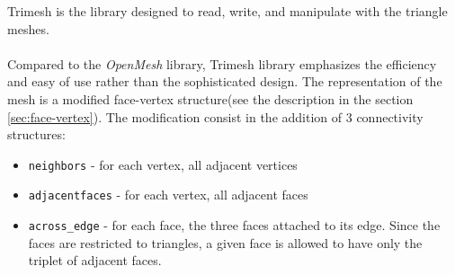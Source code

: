 Trimesh is the library designed to read, write, and manipulate with the triangle meshes\cite{trimesh}.\\
\\
Compared to the \emph{OpenMesh} library, Trimesh library emphasizes the efficiency
and easy of use rather than the sophisticated design. The representation of the mesh
is a modified face-vertex structure(see the description in the section \ref{sec:face-vertex}).
The modification consist in the addition of 3 connectivity structures:
\begin{itemize}
\item \texttt{neighbors} - for each vertex, all adjacent vertices
\item \texttt{adjacentfaces} - for each vertex, all adjacent faces
\item \texttt{across\_edge} - for each face, the three faces attached to its edge. Since the
faces are restricted to triangles, a given face is allowed to have only the triplet of adjacent faces.
\end{itemize}